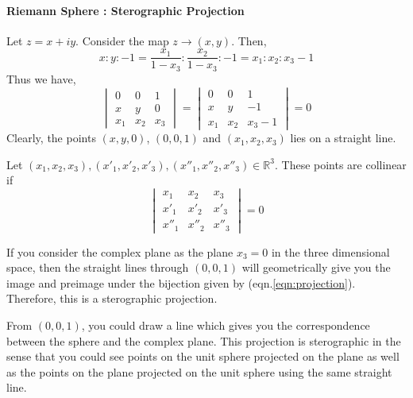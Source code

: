 \paragraph{Riemann Sphere : Sterographic Projection}
Let $z = x+iy$.
Consider the map $z \to (x,y)$.
Then,
\[ x:y:-1 = \frac{x_1}{1-x_3} : \frac{x_2}{1-x_3} : -1 = x_1 : x_2 : x_3-1 \]
Thus we have,
\[ \begin{vmatrix} 0 & 0 & 1 \\ x & y & 0 \\ x_1 & x_2 & x_3 \end{vmatrix} = \begin{vmatrix} 0 & 0 & 1 \\ x & y & -1 \\ x_1 & x_2 & x_3-1\end{vmatrix} = 0 \]
Clearly, the points $(x,y,0)$, $(0,0,1)$ and $(x_1,x_2,x_3)$ lies on a straight line.\\

\begin{commentary}
\begin{definition}[collinear]
	Let $(x_1,x_2,x_3), (x'_1,x'_2,x'_3), (x''_1,x''_2,x''_3) \in \mathbb{R}^3$.
	These points are collinear if
	\[ \begin{vmatrix} x_1 & x_2 & x_3 \\ x'_1 & x'_2 & x'_3 \\ x''_1 & x''_2 & x''_3 \end{vmatrix} = 0\]
\end{definition}
\end{commentary}

If you consider the complex plane as the plane $x_3 = 0$ in the three dimensional space, then the straight lines through $(0,0,1)$ will geometrically give you the image and preimage under the bijection given by (eqn.\ref{eqn:projection}).
Therefore, this is a sterographic projection.\\

\begin{commentary}
	From $(0,0,1)$, you could draw a line which gives you the correspondence between the sphere and the complex plane.
	This projection is sterographic in the sense that you could see points on the unit sphere projected on the plane as well as the points on the plane projected on the unit sphere using the same straight line.
\end{commentary}


